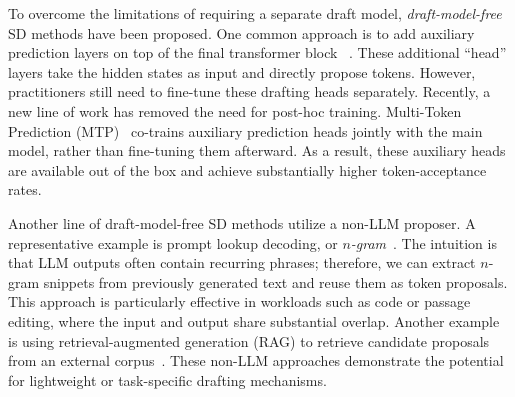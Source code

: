 To overcome the limitations of requiring a separate draft model, \emph{draft-model-free} SD methods have been proposed.
One common approach is to add auxiliary prediction layers on top of the final transformer block ~\cite{li2024eagle, li2024eagle2fasterinferencelanguage, li2025eagle3}.
These additional ``head'' layers take the hidden states as input and directly propose tokens.
However, practitioners still need to fine-tune these drafting heads separately.
Recently, a new line of work has removed the need for post-hoc training. Multi-Token Prediction (MTP)~\cite{deepseekai2025deepseekv3technicalreport,5team2025glm45agenticreasoningcoding} co-trains auxiliary prediction heads jointly with the main model, rather than fine-tuning them afterward. As a result, these auxiliary heads are available out of the box and achieve substantially higher token-acceptance rates.

Another line of draft-model-free SD methods utilize a non-LLM proposer.
A representative example is prompt lookup decoding, or \emph{$n$-gram}~\cite{saxena2023prompt}.
The intuition is that LLM outputs often contain recurring phrases; therefore, we can extract $n$-gram snippets from previously generated text and reuse them as token proposals.
This approach is particularly effective in workloads such as code or passage editing, where the input and output share substantial overlap. 
Another example is using retrieval-augmented generation (RAG) to retrieve candidate proposals from an external corpus~\cite{he2024restretrievalbasedspeculativedecoding}.
These non-LLM approaches demonstrate the potential for lightweight or task-specific drafting mechanisms.

